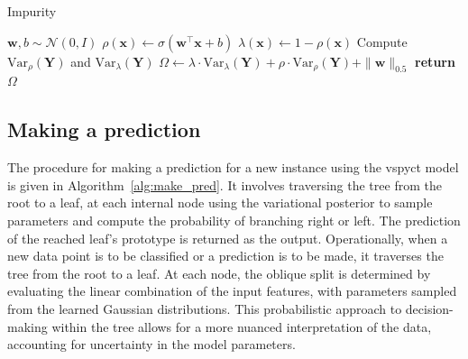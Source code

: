 \documentclass[3p,review,authoryear]{elsarticle}
\begin{document}
\begin{algorithm}[h!]
\caption{Impurity}
\begin{algorithmic}[1]

    \State $\mathbf{w}, b \sim \mathcal{N}(0, I)$ 
    \State $\rho(\mathbf{x}) \gets \sigma(\mathbf{w}^\top \mathbf{x} + b)$ 
    \State $\lambda(\mathbf{x}) \gets 1 - \rho(\mathbf{x})$ 
    \State Compute $\text{Var}_\rho(\mathbf{Y})$ and $\text{Var}_\lambda(\mathbf{Y})$ 
    \State $\Omega \gets \lambda \cdot \text{Var}_\lambda(\mathbf{Y}) + \rho \cdot \text{Var}_\rho(\mathbf{Y}) + \|\mathbf{w}\|_{0.5}$
    \State \textbf{return} $\Omega$
\EndProcedure

\end{algorithmic}
\end{algorithm}

\subsection{Making a prediction}

The procedure for making a prediction for a new instance using the \gls{vspyct} model is given in Algorithm~\ref{alg:make_pred}.
It involves traversing the tree from the root to a leaf, at each internal node using the variational posterior to sample parameters and compute the probability of branching right or left.
The prediction of the reached leaf's prototype is returned as the output.
Operationally, when a new data point is to be classified or a prediction is to be made, it traverses the tree from the root to a leaf.
At each node, the oblique split is determined by evaluating the linear combination of the input features, with parameters sampled from the learned Gaussian distributions.
This probabilistic approach to decision-making within the tree allows for a more nuanced interpretation of the data, accounting for uncertainty in the model parameters.
\end{document}
